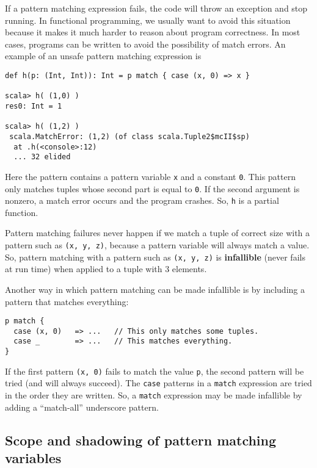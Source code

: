 If a pattern matching expression fails, the code will throw an exception
and stop running. In functional programming, we usually want to avoid
this situation because it makes it much harder to reason about program
correctness. In most cases, programs can be written to avoid the possibility
of match errors. An example of an unsafe pattern matching expression
is
\begin{lstlisting}[mathescape=false]
def h(p: (Int, Int)): Int = p match { case (x, 0) => x }

scala> h( (1,0) )
res0: Int = 1

scala> h( (1,2) )
 scala.MatchError: (1,2) (of class scala.Tuple2$mcII$sp)
  at .h(<console>:12)
  ... 32 elided 
\end{lstlisting}
Here the pattern contains a pattern variable \lstinline!x! and a
constant \lstinline!0!. This pattern only matches tuples whose second
part is equal to \lstinline!0!. If the second argument is nonzero,
a match error occurs and the program crashes. So, \lstinline!h! is
a partial function.

Pattern matching failures never happen if we match a tuple of correct
size with a pattern such as \lstinline!(x, y, z)!, because a pattern
variable will always match a value. So, pattern matching with a pattern
such as \lstinline!(x, y, z)! is \textbf{infallible}
(never fails at run time) when applied to a tuple with $3$ elements.

Another way in which pattern matching can be made infallible is by
including a pattern that matches everything:
\begin{lstlisting}
p match {
  case (x, 0)   => ...   // This only matches some tuples.
  case _        => ...   // This matches everything.
}
\end{lstlisting}
If the first pattern \lstinline!(x, 0)! fails to match the value
\lstinline!p!, the second pattern will be tried (and will always
succeed). The \lstinline!case! patterns in a \lstinline!match! expression
are tried in the order they are written. So, a \lstinline!match!
expression may be made infallible by adding a \textsf{``}match-all\textsf{''} underscore
pattern.

\subsection{Scope and shadowing of pattern matching variables\label{subsec:Scope-and-shadowing-variables}}

